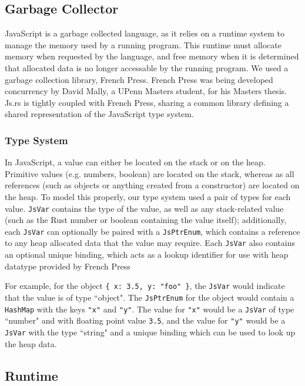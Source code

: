 \documentclass{article}
\begin{document}
\begin{multicols}{2}
\subsection{Garbage Collector}

JavaScript is a garbage collected language, as it relies on a runtime system to
manage the memory used by a running program. This runtime must allocate memory
when requested by the language, and free memory when it is determined that
allocated data is no longer accessable by the running program. We used a garbage
collection library, French Press. French Press was being developed concurrency
by David Mally, a UPenn Masters student, for his Masters thesis. Js.rs is
tightly coupled with French Press, sharing a common library defining a shared
representation of the JavaScript type system.

\subsubsection*{Type System}

In JavaScript, a value can either be located on the stack or on the heap.
Primitive values (e.g. numbers, boolean) are located on the stack, whereas as
all references (such as objects or anything created from a constructor) are
located on the heap. To model this properly, our type system used a pair of
types for each value. \texttt{JsVar} contains the type of the value, as well as
any stack-related value (such as the Rust number or boolean containing the
value itself); additionally, each \texttt{JsVar} can optionally be paired with a
\texttt{JsPtrEnum}, which contains a reference to any heap allocated data that
the value may require. Each \texttt{JsVar} also contains an optional unique
binding, which acts as a lookup identifier for use with heap datatype provided
by French Press \newline

For example, for the object \texttt{\{ x: 3.5, y: "foo" \}}, the \texttt{JsVar}
would indicate that the value is of type ``object". The \texttt{JsPtrEnum} for
the object would contain a \texttt{HashMap} with the keys \texttt{"x"} and
\texttt{"y"}. The value for \texttt{"x"} would be a \texttt{JsVar} of type
``number" and with floating point value \texttt{3.5}, and the value for
\texttt{"y"} would be a \texttt{JsVar} with the type ``string" and a unique
binding which can be used to look up the heap data.

\subsection{Runtime}


\end{multicols}
\end{document}

